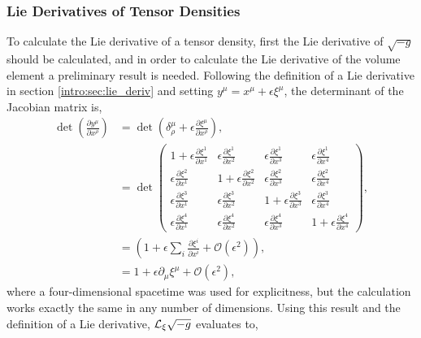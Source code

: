 \subsubsection{Lie Derivatives of Tensor Densities}
To calculate the Lie derivative of a tensor density, first the Lie derivative of $\sqrt{-g}$ should be calculated, and in order to calculate the Lie derivative of the volume element a preliminary result is needed. Following the definition of a Lie derivative in section \ref{intro:sec:lie_deriv} and setting $y^\mu = x^\mu + \epsilon \xi^\mu$, the determinant of the Jacobian matrix is,
\begin{align}
 \det\left(\frac{\partial y^\mu}{\partial x^\rho}\right) 
&= \det\left(\delta^\mu_\rho + \epsilon \frac{\partial \xi^\mu}{\partial x^\rho}\right) ,\\[7pt] 
&= \det\begin{pmatrix} 
1+\epsilon\frac{\partial \xi^1}{\partial x^1}& \epsilon\frac{\partial \xi^1}{\partial x^2}& \epsilon\frac{\partial \xi^1}{\partial x^3}& \epsilon\frac{\partial \xi^1}{\partial x^4}\\[7pt]
\epsilon\frac{\partial \xi^2}{\partial x^1}& 1+\epsilon\frac{\partial \xi^2}{\partial x^2}& \epsilon\frac{\partial \xi^2}{\partial x^3}& \epsilon\frac{\partial \xi^2}{\partial x^4}\\[7pt]
\epsilon\frac{\partial \xi^3}{\partial x^1}& \epsilon\frac{\partial \xi^3}{\partial x^2}& 1+\epsilon\frac{\partial \xi^3}{\partial x^3}& \epsilon\frac{\partial \xi^3}{\partial x^4}\\[7pt]
\epsilon\frac{\partial \xi^4}{\partial x^1}&\epsilon\frac{\partial \xi^4}{\partial x^2} & \epsilon\frac{\partial \xi^4}{\partial x^3}& 1+\epsilon\frac{\partial \xi^4}{\partial x^4}\end{pmatrix} ,\\[7pt]
&=\left(1 + \epsilon \sum_i \frac{\partial \xi^i}{\partial x^i} + \mathcal{O}(\epsilon^2)\right) ,\\[7pt]
&=1 + \epsilon \partial_\mu \xi^\mu + \mathcal{O}(\epsilon^2),
\end{align}
where a four-dimensional spacetime was used for explicitness, but the calculation works exactly the same in any number of dimensions. Using this result and the definition of a Lie derivative, $\mathcal{L}_\xi \sqrt{-g}$ evaluates to,
